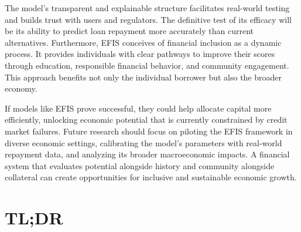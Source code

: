 \documentclass{article}
\begin{document}
The model's transparent and explainable structure facilitates real-world testing and builds trust with users and regulators. The definitive test of its efficacy will be its ability to predict loan repayment more accurately than current alternatives. Furthermore, EFIS conceives of financial inclusion as a dynamic process. It provides individuals with clear pathways to improve their scores through education, responsible financial behavior, and community engagement. This approach benefits not only the individual borrower but also the broader economy.

If models like EFIS prove successful, they could help allocate capital more efficiently, unlocking economic potential that is currently constrained by credit market failures. Future research should focus on piloting the EFIS framework in diverse economic settings, calibrating the model's parameters with real-world repayment data, and analyzing its broader macroeconomic impacts. A financial system that evaluates potential alongside history and community alongside collateral can create opportunities for inclusive and sustainable economic growth.

\section{TL;DR}
\end{document}
